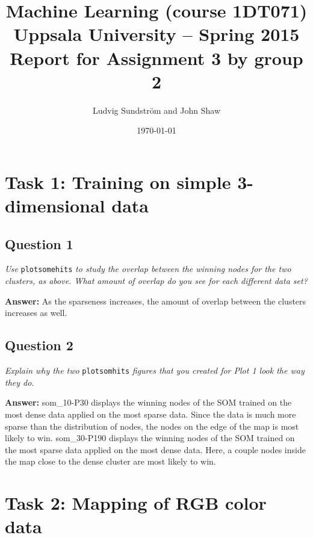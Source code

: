\documentclass[a4paper]{article}
\title{Machine Learning (course 1DT071)
Uppsala University – Spring 2015
Report for Assignment 3 by group 2}
\author{Ludvig Sundstr\"{o}m and John Shaw}
\date{\today}
\begin{document}
\maketitle

\section*{Task 1: Training on simple 3-dimensional data}

\subsection*{Question 1} 

\emph{Use } \texttt{plotsomehits} \emph{ to study the overlap between the winning nodes for the two clusters, as above. What amount of overlap do you see for each different data set?}


\textbf{Answer:} As the sparseness increases, the amount of overlap between the clusters increases as well.


\subsection*{Question 2}
\emph{Explain why the two }\texttt{plotsomhits} \emph{ figures that you created for Plot 1 look the way they do.}

\textbf{Answer:} som\_10-P30 displays the winning nodes of the SOM trained on the most dense data applied on the most sparse data. Since the data is much more sparse than the distribution of nodes, the nodes on the edge of the map is most likely to win. som\_30-P190 displays the winning nodes of the SOM trained on the most sparse data applied on the most dense data. Here, a couple nodes inside the map close to the dense cluster are most likely to win. 


\section*{Task 2: Mapping of RGB color data}
\end{document}
